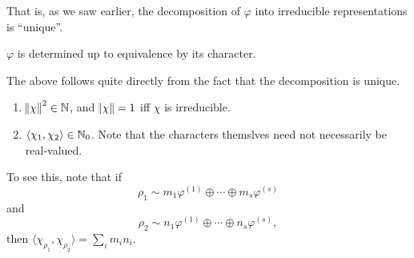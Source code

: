 		That is, as we saw earlier, the decomposition of $\varphi$ into irreducible representations is ``unique''.
		
		\begin{fcor}
			\label{cor: equivalent iff same char}
			$\varphi$ is determined up to equivalence by its character.
		\end{fcor}

		The above follows quite directly from the fact that the decomposition is unique.

		\begin{fcor}
			\label{cor: character inner product natural}
			\phantom{pain}
			\begin{enumerate}
				\item $\norm{\chi}^2 \in \mathbb{N}$, and $\norm{\chi} = 1$ iff $\chi$ is irreducible.
				\item $\langle \chi_1 , \chi_2 \rangle \in \mathbb{N}_0$. Note that the characters themslves need not necessarily be real-valued.
			\end{enumerate}
		\end{fcor}
		
		To see this, note that if
		\[ \rho_1 \sim m_1 \varphi^{(1)} \oplus \cdots \oplus m_s \varphi^{(s)} \]
		and
		\[ \rho_2 \sim n_1 \varphi^{(1)} \oplus \cdots \oplus n_s \varphi^{(s)}, \]
		then $\langle \chi_{\rho_1} , \chi_{\rho_2} \rangle = \sum_i m_i n_i$.

